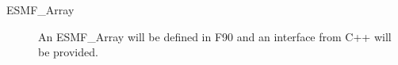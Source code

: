 


\begin{description}

\item [ESMF\_Array] An ESMF\_Array will be defined in F90 and an interface
from C++ will be provided.

\end{description}



